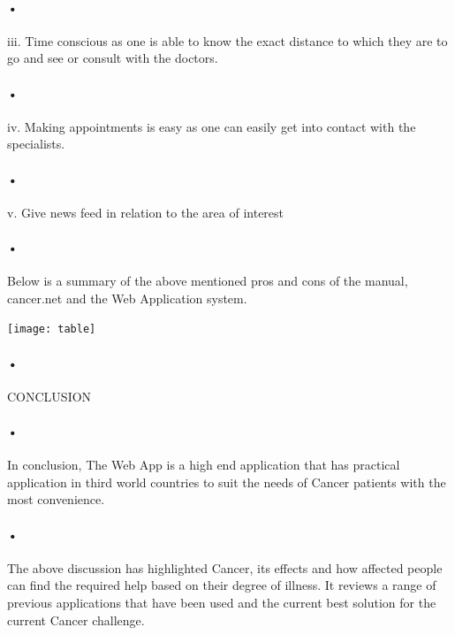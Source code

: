 \documentclass[12pt]{article}
\begin{document}
\paragraph{•}iii. Time conscious as one is able to know the exact distance to which they are to go and see or consult with the doctors.
\paragraph{•}iv. Making appointments is easy as one can easily get into contact with the specialists.
\paragraph{•}v.	Give news feed in relation to the area of interest

\paragraph{•}Below is a summary of the above mentioned pros and cons of the manual, cancer.net and the Web Application system.

\begin{center}
\texttt{[image: table]}
\end{center}

\paragraph{•}CONCLUSION

\paragraph{•}In conclusion, The Web App is a high end application that has practical application in third world countries to suit the needs of Cancer patients with the most convenience.
\paragraph{•}The above discussion has highlighted Cancer, its effects and how affected people can find the required help based on their degree of illness. It reviews a range of previous applications that have been used and the current best solution for the current Cancer challenge.
\end{document}
